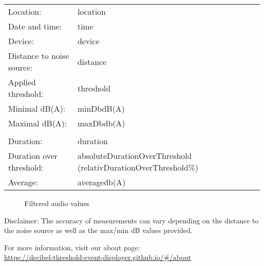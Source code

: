\documentclass{article}
\begin{document}
\thispagestyle{empty}

\begin{table}[h]
    \centering
    \begin{tabular}{l l}
        Location:  & {{location}}  \\
        Date and time:      & {{time}}      \\
        Device:    & {{device}}    \\
        Distance to noise source:  & {{distance}}  \\
        Applied threshold: & {{threshold}} \\
        Minimal dB(A):     & {{minDb}}dB(A)     \\
        Maximal dB(A):     & {{maxDb}}db(A)     \\
                                        \\
        Duration: & {{duration}}\\
        Duration over threshold: & {{absoluteDurationOverThreshold}} ({{relativDurationOverThreshold}}\%) \\
        Average: & {{average}}db(A) \\
    \end{tabular}
    \label{tab:table}
\end{table}

\begin{figure}[h!]
    \begin{center}
        \caption{Filtered audio values}
    \end{center}
    \label{fig:figure}
\end{figure}

Disclaimer: The accuracy of measurements can vary depending on the distance to the noise source as well as the max/min dB values provided.

For more information, visit our about page: \\ \url{https://decibel-threshold-event-displayer.github.io/#/about}
\end{document}
